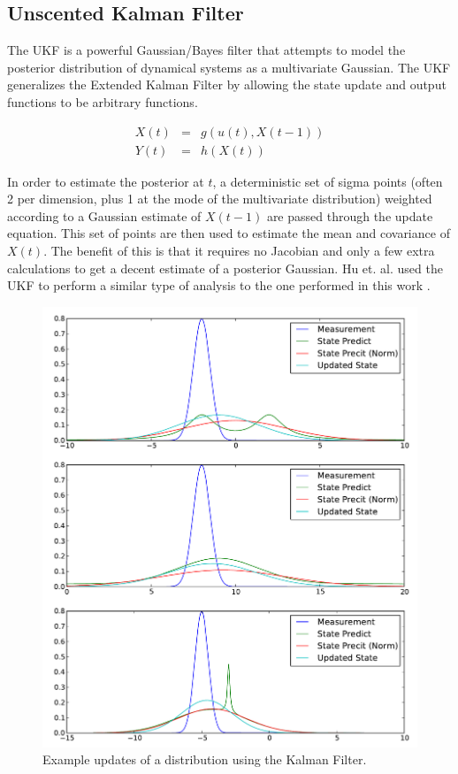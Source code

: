 \subsection{Unscented Kalman Filter}
\label{sec:Unscented Kalman Filter}
The \ac{UKF} is a powerful Gaussian/Bayes filter that attempts
to model the posterior distribution of dynamical systems as a multivariate
Gaussian. The \ac{UKF} generalizes the Extended Kalman
Filter by allowing the state update and output functions to be arbitrary functions.

\begin{eqnarray}
X(t) &=& g(u(t), X(t-1))\\
Y(t) &=& h(X(t))
\end{eqnarray}

In order to estimate the posterior at $t$, a deterministic set of sigma points 
(often 2 per dimension, plus 1 at the mode of the multivariate distribution)
weighted according to a Gaussian estimate of $X(t-1)$ are passed through
the update equation. This set of points are then used to estimate the 
mean and covariance of $X(t)$. The benefit of this is that it requires
no Jacobian and only a few extra calculations to get a decent estimate of
a posterior Gaussian. Hu et. al. used the \ac{UKF} to  perform a similar type of analysis to
the one performed in this work \cite{Hu2009}. 

\begin{figure}
\includegraphics[width=16cm]{images/kalman}
\caption{Example updates of a distribution using the Kalman Filter.}
\label{fig:EKFWorking}
\end{figure}

